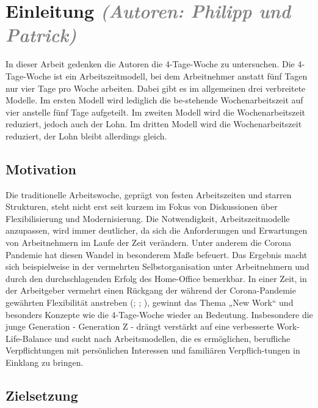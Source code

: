 \chapter{Einleitung \textit{\textcolor{gray}{(Autoren: Philipp und Patrick)}} }

In dieser Arbeit gedenken die Autoren die 4-Tage-Woche zu untersuchen. 
Die 4-Tage-Woche ist ein Arbeitszeitmodell, bei dem Arbeitnehmer anstatt fünf Tagen nur vier Tage pro Woche arbeiten. 
Dabei gibt es im allgemeinen drei verbreitete Modelle. Im ersten Modell wird lediglich die be-stehende Wochenarbeitszeit auf vier anstelle fünf Tage aufgeteilt. 
Im zweiten Modell wird die Wochenarbeitszeit reduziert, jedoch auch der Lohn. Im dritten Modell wird die Wochenarbeitszeit reduziert, der Lohn bleibt allerdings gleich. \parencite[vgl.][]{habdank_deutscher_2024}

\section{Motivation}

Die traditionelle Arbeitswoche, geprägt von festen Arbeitszeiten und starren Strukturen, steht nicht erst seit kurzem im Fokus von 
Diskussionen über Flexibilisierung und Modernisierung. Die Notwendigkeit, Arbeitszeitmodelle anzupassen, wird immer deutlicher, da sich 
die Anforderungen und Erwartungen von Arbeitnehmern im Laufe der Zeit verändern. Unter anderem die Corona Pandemie hat diesen Wandel in 
besonderem Maße befeuert. Das Ergebnis macht sich beispielweise in der vermehrten Selbstorganisation unter Arbeitnehmern und durch den 
durchschlagenden Erfolg des Home-Office bemerkbar. \parencite[vgl.][S. 73]{haide_arbeitswelt_2022}
In einer Zeit, in der Arbeitgeber vermehrt einen Rückgang der während der Corona-Pandemie gewährten Flexibilität anstreben (\cite{elias_googles_2023}; \cite{lee_apple_2022}; \cite{vanian_meta_2023}), 
gewinnt das Thema „New Work“ und besonders Konzepte wie die 4-Tage-Woche wieder an Bedeutung.
Insbesondere die junge Generation - Generation Z - drängt verstärkt auf eine verbesserte Work-Life-Balance und sucht nach Arbeitsmodellen, 
die es ermöglichen, berufliche Verpflichtungen mit persönlichen Interessen und familiären Verpflich-tungen in Einklang zu bringen. \parencite[vgl.][S. 10]{onlyfy_wechselwilligkeitsstudie_2023}

\section{Zielsetzung}

